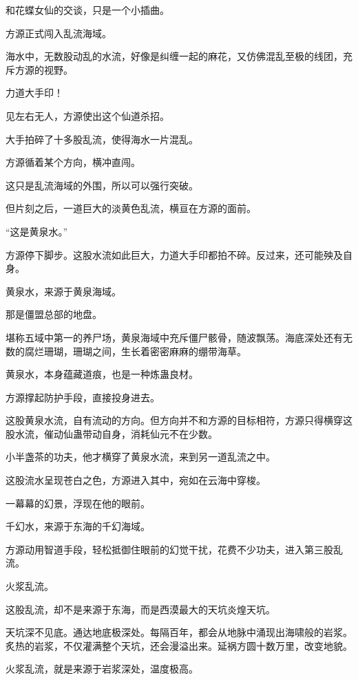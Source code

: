 
\begin{this_body}

和花蝶女仙的交谈，只是一个小插曲。

方源正式闯入乱流海域。

海水中，无数股动乱的水流，好像是纠缠一起的麻花，又仿佛混乱至极的线团，充斥方源的视野。

力道大手印！

见左右无人，方源使出这个仙道杀招。

大手拍碎了十多股乱流，使得海水一片混乱。

方源循着某个方向，横冲直闯。

这只是乱流海域的外围，所以可以强行突破。

但片刻之后，一道巨大的淡黄色乱流，横亘在方源的面前。

“这是黄泉水。”

方源停下脚步。这股水流如此巨大，力道大手印都拍不碎。反过来，还可能殃及自身。

黄泉水，来源于黄泉海域。

那是僵盟总部的地盘。

堪称五域中第一的养尸场，黄泉海域中充斥僵尸骸骨，随波飘荡。海底深处还有无数的腐烂珊瑚，珊瑚之间，生长着密密麻麻的绷带海草。

黄泉水，本身蕴藏道痕，也是一种炼蛊良材。

方源撑起防护手段，直接投身进去。

这股黄泉水流，自有流动的方向。但方向并不和方源的目标相符，方源只得横穿这股水流，催动仙蛊带动自身，消耗仙元不在少数。

小半盏茶的功夫，他才横穿了黄泉水流，来到另一道乱流之中。

这股流水呈现苍白之色，方源进入其中，宛如在云海中穿梭。

一幕幕的幻景，浮现在他的眼前。

千幻水，来源于东海的千幻海域。

方源动用智道手段，轻松抵御住眼前的幻觉干扰，花费不少功夫，进入第三股乱流。

火浆乱流。

这股乱流，却不是来源于东海，而是西漠最大的天坑炎煌天坑。

天坑深不见底。通达地底极深处。每隔百年，都会从地脉中涌现出海啸般的岩浆。炙热的岩浆，不仅灌满整个天坑，还会漫溢出来。延祸方圆十数万里，改变地貌。

火浆乱流，就是来源于岩浆深处，温度极高。


\end{this_body}
